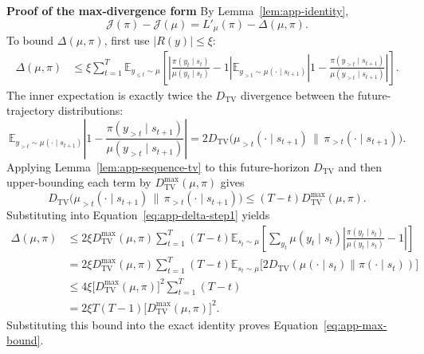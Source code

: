 \textbf{Proof of the max-divergence form}
By Lemma~\ref{lem:app-identity},
\begin{equation*}
\mathcal J(\pi)-\mathcal J(\mu)=L'_{\mu}(\pi)-\Delta(\mu,\pi).
\end{equation*}
To bound $\Delta(\mu,\pi)$, first use $|R(y)|\le\xi$:
\begin{align}
\Delta(\mu,\pi)
&\le \xi\sum_{t=1}^{T}\mathbb E_{y_{\le t}\sim\mu}\left[
\left|\frac{\pi(y_t\mid s_t)}{\mu(y_t\mid s_t)}-1\right|
\mathbb E_{y_{>t}\sim\mu(\cdot\mid s_{t+1})}
\left|1-\frac{\pi(y_{>t}\mid s_{t+1})}{\mu(y_{>t}\mid s_{t+1})}\right|
\right].
\label{eq:app-delta-step1}
\end{align}
The inner expectation is exactly twice the $D_{\mathrm{TV}}$ divergence between the future-trajectory distributions:
\begin{equation*}
\mathbb E_{y_{>t}\sim\mu(\cdot\mid s_{t+1})}
\left|1-\frac{\pi(y_{>t}\mid s_{t+1})}{\mu(y_{>t}\mid s_{t+1})}\right|
=2D_{\mathrm{TV}}\bigl(\mu_{>t}(\cdot\mid s_{t+1})\,\|\,\pi_{>t}(\cdot\mid s_{t+1})\bigr).
\end{equation*}
Applying Lemma~\ref{lem:app-sequence-tv} to this future-horizon $D_{\mathrm{TV}}$ and then upper-bounding each term by $D_{\mathrm{TV}}^{\max}(\mu,\pi)$ gives
\begin{equation*}
D_{\mathrm{TV}}\bigl(\mu_{>t}(\cdot\mid s_{t+1})\,\|\,\pi_{>t}(\cdot\mid s_{t+1})\bigr)
\le (T-t)D_{\mathrm{TV}}^{\max}(\mu,\pi).
\end{equation*}
Substituting into Equation~\eqref{eq:app-delta-step1} yields
\begin{align*}
\Delta(\mu,\pi)
&\le 2\xi D_{\mathrm{TV}}^{\max}(\mu,\pi)
\sum_{t=1}^{T}(T-t)
\mathbb E_{s_t\sim\mu}\left[\sum_{y_t}\mu(y_t\mid s_t)
\left|\frac{\pi(y_t\mid s_t)}{\mu(y_t\mid s_t)}-1\right|\right]\\
&=2\xi D_{\mathrm{TV}}^{\max}(\mu,\pi)
\sum_{t=1}^{T}(T-t)
\mathbb E_{s_t\sim\mu}\Big[2D_{\mathrm{TV}}(\mu(\cdot\mid s_t)\|\pi(\cdot\mid s_t))\Big]\\
&\le 4\xi\bigl[D_{\mathrm{TV}}^{\max}(\mu,\pi)\bigr]^2\sum_{t=1}^{T}(T-t)\\
&=2\xi T(T-1)\bigl[D_{\mathrm{TV}}^{\max}(\mu,\pi)\bigr]^2.
\end{align*}
Substituting this bound into the exact identity proves Equation~\eqref{eq:app-max-bound}.

